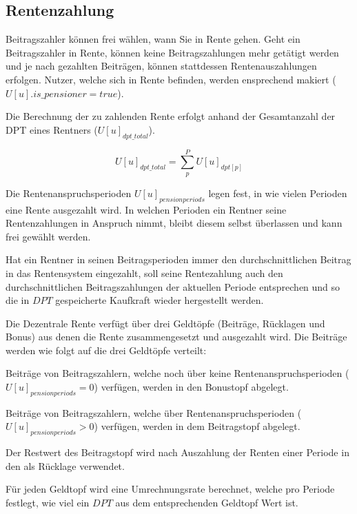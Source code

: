 \subsection{Rentenzahlung}

Beitragszahler können frei wählen, wann Sie in Rente gehen. Geht ein Beitragszahler in Rente, können keine Beitragszahlungen mehr getätigt werden und je nach gezahlten Beiträgen, können stattdessen Rentenauszahlungen erfolgen.
Nutzer, welche sich in Rente befinden, werden ensprechend makiert ($U[u].is\_pensioner = true$).

Die Berechnung der zu zahlenden Rente erfolgt anhand der Gesamtanzahl der DPT eines Rentners ($U[u]_{dpt\_total}$).

\begin{equation}
U[u]_{dpt\_total} = \sum_{p}^{P} U[u]_{dpt[p]}
\end{equation}

Die Rentenanspruchsperioden $U[u]_{pensionperiods}$ legen fest, in wie vielen Perioden eine Rente ausgezahlt wird. In
welchen Perioden ein Rentner seine Rentenzahlungen in Anspruch nimmt, bleibt diesem selbst überlassen und kann frei
gewählt werden.

Hat ein
Rentner in seinen Beitragsperioden immer den durchschnittlichen Beitrag in das
Rentensystem eingezahlt, soll seine
Rentezahlung auch den durchschnittlichen Beitragszahlungen der aktuellen
Periode entsprechen und so die in $DPT$ gespeicherte Kaufkraft wieder hergestellt werden.


Die Dezentrale Rente verfügt über drei Geldtöpfe (Beiträge, Rücklagen und Bonus) 
aus denen die Rente zusammengesetzt und ausgezahlt wird. Die Beiträge werden wie folgt auf 
die drei Geldtöpfe verteilt:
\begin{compactenum}
\item Beiträge von Beitragszahlern, welche noch über keine Rentenanspruchsperioden ($U[u]_{pensionperiods} = 0$) verfügen, werden in den Bonustopf abgelegt.
\item Beiträge von Beitragszahlern, welche über Rentenanspruchsperioden ($U[u]_{pensionperiods} > 0$) verfügen, werden in dem Beitragstopf abgelegt.
\item Der Restwert des Beitragstopf wird nach Auszahlung der Renten einer Periode in den als Rücklage verwendet.
\end{compactenum}

Für jeden Geldtopf wird eine Umrechnungsrate berechnet, welche pro 
Periode festlegt, wie viel ein $DPT$ aus dem entsprechenden
Geldtopf Wert ist.

